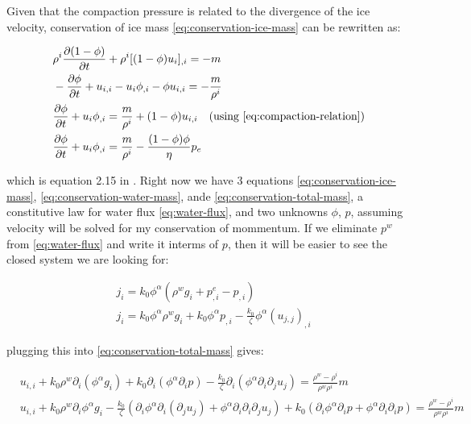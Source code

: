 \documentclass[a4paper,12pt]{article}
\newcommand{\pd}[2]{\frac{\partial #1}{\partial #2}}
\begin{document}
Given that the compaction pressure is related to the divergence of the ice velocity, conservation of ice mass \eqref{eq:conservation-ice-mass} can be rewritten as:

\begin{align}
  &\rho^i\pd{(1 - \phi)}{t} + \rho^i [(1 - \phi) u_i]_{,i} = - m \\
  &-\pd{\phi}{t} + u_{i,i} - u_i \phi_{,i} - \phi u_{i,i} = -\frac{m}{\rho^i}\\
  &\pd{\phi}{t} + u_i\phi_{,i} = \frac{m}{\rho^i} + (1 - \phi)u_{i,i} ~~~ (\text{using \eqref{eq:compaction-relation}}) \label{eq:ice-mass}\\
  &\pd{\phi}{t} + u_i\phi_{,i} = \frac{m}{\rho^i} - \frac{(1 - \phi)\phi}{\eta}p_e
\end{align}

which is equation 2.15 in \cite{schoof_2016}. Right now we have 3 equations \eqref{eq:conservation-ice-mass}, \eqref{eq:conservation-water-mass}, ande \eqref{eq:conservation-total-mass}, a constitutive law for water flux \eqref{eq:water-flux}, and two unknowns $\phi$, $p$, assuming velocity will be solved for my conservation of mommentum. If we eliminate $p^w$ from \eqref{eq:water-flux} and write it interms of $p$, then it will be easier to see the closed system we are looking for:

\begin{align}
  &j_i = k_0\phi^\alpha(\rho^w g_i + p_{,i}^e - p_{,i})\\
  & j_i = k_0 \phi^\alpha \rho^w g_i + k_0\phi^\alpha p_{,i} - \frac{k_0}{\zeta}\phi^\alpha(u_{j,j})_{,i}
\end{align}

plugging this into \eqref{eq:conservation-total-mass} gives:

\begin{align}
  & u_{i,i} + k_0\rho^w\partial_i(\phi^\alpha g_i) + k_0 \partial_i (\phi^\alpha \partial_i p) - \frac{k_0}{\zeta}\partial_i\left(\phi^{\alpha} \partial_i\partial_ju_{j}\right) = \frac{\rho^w - \rho^i}{\rho^w \rho^i} m \\\label{eq:total-mass-velocity}
  & u_{i,i} + k_0\rho^w\partial_i\phi^\alpha g_i - \frac{k_0}{\zeta}(\partial_i\phi^{\alpha} \partial_i(\partial_ju_{j}) + \phi^{\alpha} \partial_i\partial_i\partial_ju_{j}) + k_0 (\partial_i\phi^\alpha \partial_i p + \phi^\alpha \partial_i\partial_i p)= \frac{\rho^w - \rho^i}{\rho^w \rho^i} m \\\label{eq:total-mass-velocity}
\end{align}
\end{document}

